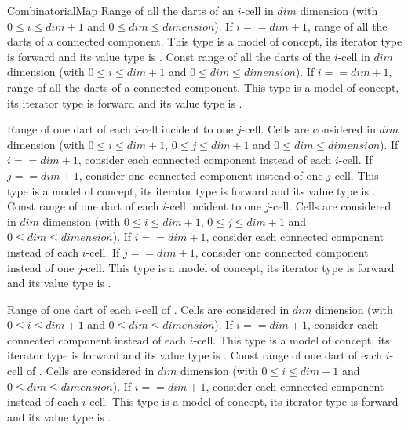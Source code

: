 \begin{ccRefConcept}{CombinatorialMap}
{Range of all the darts of an $i$-cell in $dim$ dimension
  (with $0\leq i \leq dim+1$ and $0 \leq dim \leq dimension$). If $i==dim+1$,  
  range of all the darts of a connected component.
  This type is a model of  concept, its iterator type is forward and its value type is .}
\ccGlue
{}
{Const range of all the darts of the $i$-cell in $dim$ dimension 
  (with $0\leq i \leq dim+1$ and $0 \leq dim \leq dimension$). If $i==dim+1$,  
  range of all the darts of a connected component.
  This type is a model of  concept, its iterator type is forward and its value type is .}

{Range of one dart of each $i$-cell incident to one $j$-cell.
  Cells are considered in $dim$ dimension  
  (with $0\leq i \leq dim+1$, $0\leq j \leq dim+1$ and
  $0 \leq dim \leq dimension$). If $i==dim+1$,  
  consider each connected component instead of each $i$-cell. If $j==dim+1$,
  consider one connected component instead of one $j$-cell.
  This type is a model of  concept, its iterator type is forward and its value type is .}
\ccGlue
{}
{Const range of one dart of each $i$-cell incident to one $j$-cell.
  Cells are considered in $dim$ dimension  
  (with $0\leq i \leq dim+1$, $0\leq j \leq dim+1$ and
  $0 \leq dim \leq dimension$). If $i==dim+1$,  
  consider each connected component instead of each $i$-cell. If $j==dim+1$,
  consider one connected component instead of one $j$-cell.
  This type is a model of  concept, its iterator type is forward and its value type is .}

{Range of one dart of each $i$-cell of .
  Cells are considered in $dim$ dimension  
  (with $0\leq i \leq dim+1$ and $0 \leq dim \leq dimension$). If $i==dim+1$,  
  consider each connected component instead of each $i$-cell. 
  This type is a model of  concept, its iterator type is forward and its value type is .}
\ccGlue
{}
{Const range of one dart of each $i$-cell of .
  Cells are considered in $dim$ dimension 
  (with $0\leq i \leq dim+1$ and $0 \leq dim \leq dimension$). If $i==dim+1$,  
  consider each connected component instead of each $i$-cell. 
  This type is a model of  concept, its iterator type is forward and its value type is .}


\end{ccRefConcept}
